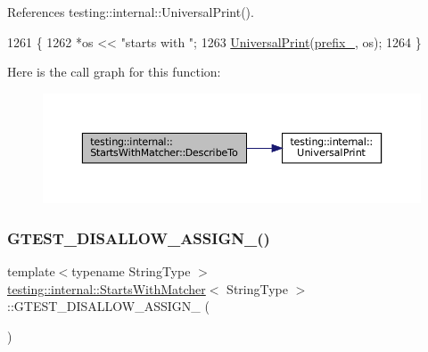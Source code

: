 References testing\+::internal\+::\+Universal\+Print().


\begin{DoxyCode}
1261                                         \{
1262     *os << \textcolor{stringliteral}{"starts with "};
1263     \hyperlink{namespacetesting_1_1internal_a30708fa2bacf11895b03bdb21eb72309}{UniversalPrint}(\hyperlink{classtesting_1_1internal_1_1StartsWithMatcher_a9122de4c38f40c95f822fb8d290942f9}{prefix\_}, os);
1264   \}
\end{DoxyCode}
Here is the call graph for this function\+:
\nopagebreak
\begin{figure}[H]
\begin{center}
\leavevmode
\includegraphics[width=350pt]{classtesting_1_1internal_1_1StartsWithMatcher_af52b4c04ade7f5226c7302c845d44eaf_cgraph}
\end{center}
\end{figure}
\mbox{\label{classtesting_1_1internal_1_1StartsWithMatcher_a1e3864211b6430dbe7b5f37a0d525045}} 
\subsubsection{\texorpdfstring{G\+T\+E\+S\+T\+\_\+\+D\+I\+S\+A\+L\+L\+O\+W\+\_\+\+A\+S\+S\+I\+G\+N\+\_\+()}{GTEST\_DISALLOW\_ASSIGN\_()}}
{\footnotesize\ttfamily template$<$typename String\+Type $>$ \\
\hyperlink{classtesting_1_1internal_1_1StartsWithMatcher}{testing\+::internal\+::\+Starts\+With\+Matcher}$<$ String\+Type $>$\+::G\+T\+E\+S\+T\+\_\+\+D\+I\+S\+A\+L\+L\+O\+W\+\_\+\+A\+S\+S\+I\+G\+N\+\_\+ (\begin{DoxyParamCaption}\item[{\hyperlink{classtesting_1_1internal_1_1StartsWithMatcher}{Starts\+With\+Matcher}$<$ String\+Type $>$}]{ }\end{DoxyParamCaption})\hspace{0.3cm}{\ttfamily [private]}}

